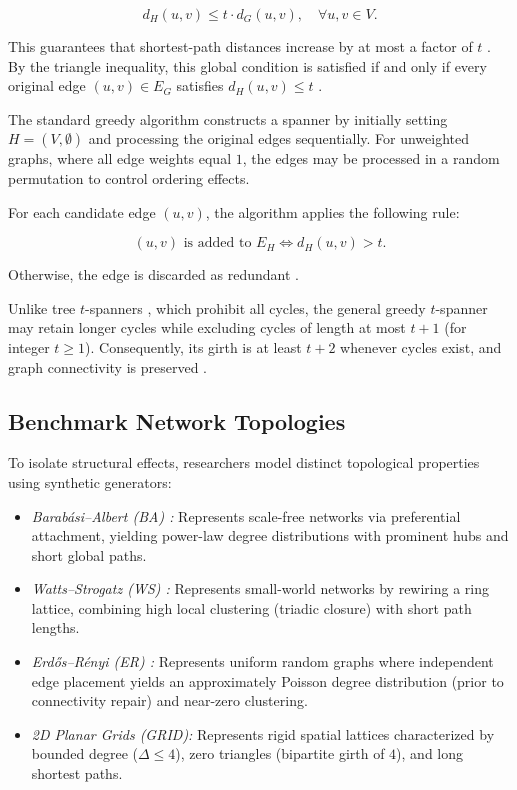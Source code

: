 \documentclass[conference]{IEEEtran}
\begin{document}
\begin{equation}
    d_H(u,v) \leq t \cdot d_G(u,v),
    \quad \forall u,v \in V.
\end{equation}

This guarantees that shortest-path distances increase by at most a factor of $t$ \cite{ref2, ref3}. By the triangle inequality, this global condition is satisfied if and only if every original edge $(u,v) \in E_G$ satisfies $d_H(u,v) \leq t$ \cite{ref2}.

The standard greedy algorithm \cite{ref5, ref2} constructs a spanner by initially setting $H = (V, \emptyset)$ and processing the original edges sequentially. For unweighted graphs, where all edge weights equal $1$, the edges may be processed in a random permutation to control ordering effects.

For each candidate edge $(u,v)$, the algorithm applies the following rule:

\begin{equation}
    (u,v) \text{ is added to } E_H
    \iff d_H(u,v) > t.
\end{equation}

Otherwise, the edge is discarded as redundant \cite{ref16, ref2}.

Unlike tree $t$-spanners \cite{ref11, ref12}, which prohibit all cycles, the general greedy $t$-spanner may retain longer cycles while excluding cycles of length at most $t+1$ (for integer $t \ge 1$). Consequently, its girth is at least $t+2$ whenever cycles exist, and graph connectivity is preserved \cite{ref2, ref17, ref4}.


\subsection{Benchmark Network Topologies}
To isolate structural effects, researchers model distinct topological properties using synthetic generators:
\begin{itemize}
    \item \textit{Barab\'{a}si--Albert (BA) \cite{ref13}:} Represents scale-free networks via preferential attachment, yielding power-law degree distributions with prominent hubs and short global paths.
    \item \textit{Watts--Strogatz (WS) \cite{ref14}:} Represents small-world networks by rewiring a ring lattice, combining high local clustering (triadic closure) with short path lengths.
    \item \textit{Erd\H{o}s--R\'{e}nyi (ER) \cite{ref15}:} Represents uniform random graphs where independent edge placement yields an approximately Poisson degree distribution (prior to connectivity repair) and near-zero clustering.
    \item \textit{2D Planar Grids (GRID):} Represents rigid spatial lattices characterized by bounded degree ($\Delta \le 4$), zero triangles (bipartite girth of $4$), and long shortest paths.
\end{itemize}
\end{document}

